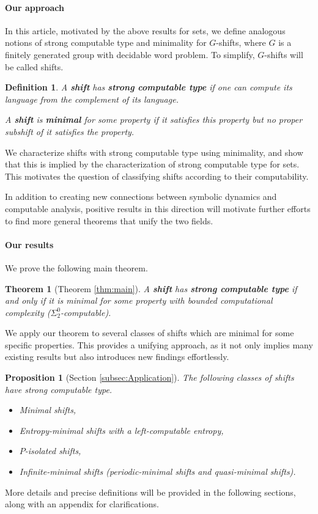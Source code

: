 \documentclass[french,american]{article}
\theoremstyle{plain}
\theoremstyle{definition}
\theoremstyle{remark}
\theoremstyle{plain}
\newtheorem*{definition*}{Definition}
\newtheorem*{theorem*}{Theorem}
\newtheorem*{proposition*}{Proposition}
\begin{document}
\paragraph*{Our approach}

In this article, motivated by the above results for sets, we define
analogous notions of strong computable type and minimality for $G$-shifts,
where $G$ is a finitely generated group with decidable word problem.
To simplify, $G$-shifts will be called shifts.
\begin{definition*}
A \textbf{shift }has \textbf{strong computable type} if one can compute
its language from the complement of its language.

A \textbf{shift} is \textbf{minimal} for some property if it satisfies
this property but no proper subshift of it satisfies the property.
\end{definition*}
We characterize shifts with strong computable type using minimality,
and show that this is implied by the characterization of strong computable type for sets. This motivates the question of classifying shifts according to their computability.

In addition to creating new connections between symbolic dynamics
and computable analysis, positive results in this direction will motivate
further efforts to find more general theorems that unify the two fields.

\paragraph*{Our results}

We prove the following main theorem.
\begin{theorem*}[Theorem \ref{thm:main}]
A \textbf{shift} has \textbf{strong computable type} if and only
if it is minimal for some property with bounded computational complexity ($\Sigma_2^0$-computable).
\end{theorem*}
We apply our theorem to several classes of shifts which are minimal
for some specific properties. This provides a unifying approach, as
it not only implies many existing results but also introduces new
findings effortlessly. 
\begin{proposition*}[Section \ref{subsec:Application}]
The following classes of shifts have strong computable type.
\begin{itemize}
\item Minimal shifts,
\item Entropy-minimal shifts with a left-computable entropy,
\item $P$-isolated shifts,
\item Infinite-minimal shifts (periodic-minimal shifts and quasi-minimal
shifts).
\end{itemize}
\end{proposition*}
More details and precise definitions will be provided in the following
sections, along with an appendix for clarifications. 
\end{document}
